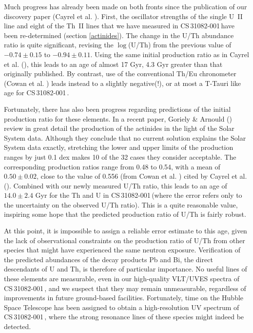 \documentclass{aa}
\def\cs{CS\,31082-001\,}
\begin{document}
Much progress has already been made on both fronts since the publication of our
discovery paper (Cayrel et al. \cite{cayrel01}). First, the oscillator
strengths of the single U~II line and eight of the Th~II lines that we have
measured in \cs have been re-determined (section \ref{actinides}). The
change in the U/Th abundance ratio is quite significant, revising the $\log
$(U/Th) from the previous value of $-0.74\pm 0.15$ to $-0.94\pm 0.11$.  Using
the same initial production ratio as in Cayrel et al. (\cite{cayrel01}), this
leads to an age of almost 17 Gyr, 4.3 Gyr greater than that originally
published.  By contrast, use of the conventional Th/Eu chronometer (Cowan et
al. \cite{cowan99}) leads instead to a slightly negative(!), or at most a 
T-Tauri like age for \cs.

Fortunately, there has also been progress regarding predictions of the initial
production ratio for these elements. In a recent paper, Goriely \& Arnould
(\cite{ga01}) review in great detail the production of the actinides in the
light of the Solar System data. Although they conclude that no current solution
explains the Solar System data exactly, stretching the lower and upper limits
of the production ranges by just 0.1 dex makes 10 of the 32 cases they 
consider acceptable. The corresponding production ratios range from 0.48 to
0.54, with a mean of $0.50 \pm 0.02$, close to the value of 0.556
(from Cowan et al. \cite{cowan99}) cited by Cayrel et al. (\cite{cayrel01}).
Combined with our newly measured U/Th ratio, this leads to an age of $14.0\pm
2.4$ Gyr for the Th and U in \cs (where the error refers only to the
uncertainty on the observed U/Th ratio). This is a quite reasonable value,
inspiring some hope that the predicted production ratio of U/Th is fairly
robust.

At this point, it is impossible to assign a reliable error estimate to this
age, given the lack of observational constraints on the production ratio of
U/Th from other species that might have experienced the same neutron exposure.
Verification of the predicted abundances of the decay products Pb and Bi, the
direct descendants of U and Th, is therefore of particular importance. No
useful lines of these elements are measurable, even in our high-quality
VLT/UVES spectra of \cs , and we suspect that they may remain unmeasurable,
regardless of improvements in future ground-based facilities.  Fortunately,
time on the Hubble Space Telescope has been assigned to obtain a
high-resolution UV spectrum of \cs, where the strong resonance lines of these
species might indeed be detected.
\end{document}
